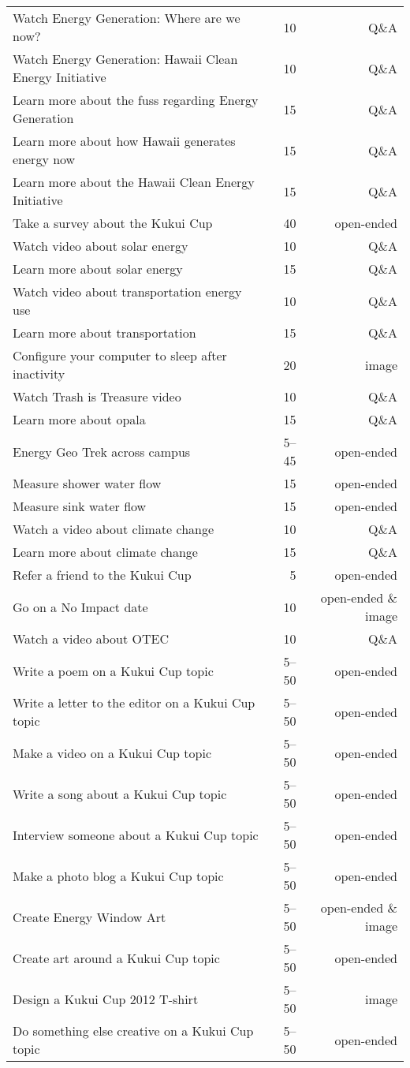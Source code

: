 \begin{center}
\begin{longtable}{| l | r | r |}
Watch Energy Generation: Where are we now? & 10 & Q\&A \\
Watch Energy Generation: Hawaii Clean Energy Initiative & 10 & Q\&A \\
Learn more about the fuss regarding Energy Generation & 15 & Q\&A \\
Learn more about how Hawaii generates energy now & 15 & Q\&A \\
Learn more about the Hawaii Clean Energy Initiative & 15 & Q\&A \\
Take a survey about the Kukui Cup & 40 & open-ended \\
Watch video about solar energy & 10 & Q\&A \\
Learn more about solar energy & 15 & Q\&A \\
Watch video about transportation energy use & 10 & Q\&A \\
Learn more about transportation & 15 & Q\&A \\
Configure your computer to sleep after inactivity & 20 & image \\
Watch Trash is Treasure video & 10 & Q\&A \\
Learn more about opala & 15 & Q\&A \\
Energy Geo Trek across campus & 5--45 & open-ended \\
Measure shower water flow & 15 & open-ended \\
Measure sink water flow & 15 & open-ended \\
Watch a video about climate change & 10 & Q\&A \\
Learn more about climate change & 15 & Q\&A \\
Refer a friend to the Kukui Cup & 5 & open-ended \\
Go on a No Impact date & 10 & open-ended \& image \\
Watch a video about OTEC & 10 & Q\&A \\
Write a poem on a Kukui Cup topic & 5--50 & open-ended \\
Write a letter to the editor on a Kukui Cup topic & 5--50 & open-ended \\
Make a video on a Kukui Cup topic & 5--50 & open-ended \\
Write a song about a Kukui Cup topic & 5--50 & open-ended \\
Interview someone about a Kukui Cup topic & 5--50 & open-ended \\
Make a photo blog a Kukui Cup topic & 5--50 & open-ended \\
Create Energy Window Art & 5--50 & open-ended \& image \\
Create art around a Kukui Cup topic & 5--50 & open-ended \\
Design a Kukui Cup 2012 T-shirt & 5--50 & image \\
Do something else creative on a Kukui Cup topic & 5--50 & open-ended \\
	\end{longtable}
\end{center}


